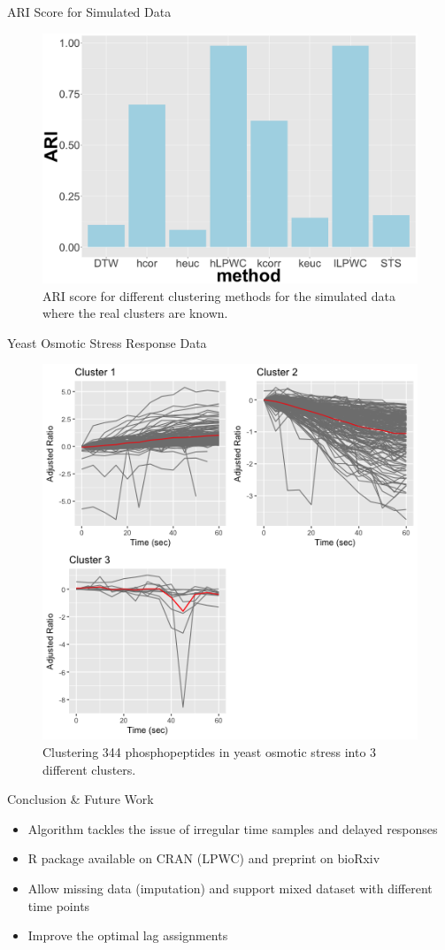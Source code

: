 \documentclass[10pt]{beamer}
\begin{document}
\begin{frame}{ARI Score for Simulated Data}
\begin{figure}
     \includegraphics[width=0.7\linewidth]{ARI-Impulse.png}
      \caption{ARI score for different clustering methods for the simulated data where the real clusters are known.}
       \label{fig:ariscore}
    \end{figure}

\end{frame}



\begin{frame}{Yeast Osmotic Stress Response Data}
\begin{figure}
     \includegraphics[width=0.65\linewidth]{yeast_cluster_lLPC.png}
      \caption{Clustering 344 phosphopeptides in yeast osmotic stress into 3 different clusters. }
       \label{fig:ariscore}
    \end{figure}

\end{frame}




\begin{frame}{Conclusion \& Future Work}
\begin{itemize}
\item Algorithm tackles the issue of irregular time samples and delayed responses
\item R package available on CRAN (LPWC) and preprint on bioRxiv
\item Allow missing data (imputation) and support mixed dataset with different time points
\item Improve the optimal lag assignments
\end{itemize}
\end{frame}
\end{document}
